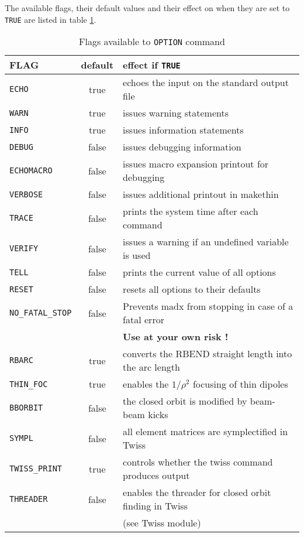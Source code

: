 The available flags, their default values and their effect on \madx when
they are set to \texttt{TRUE} are listed in table \ref{table:options}.

\begin{table}[ht]
  \caption{Flags available to \texttt{OPTION} command}
  \vspace{1ex}
  \centering
  \label{table:options}
  \begin{tabular}{|l|c|l|}
    \hline
    \textbf{FLAG }  & \textbf{default} & \textbf{effect if \texttt{TRUE}} \\
    \hline
    \texttt{ECHO}      & true  & echoes the input on the standard output file \\
    \texttt{WARN}      & true  & issues warning statements\\
    \texttt{INFO}      & true  & issues information statements\\
    \texttt{DEBUG}     & false & issues debugging information \\
    \texttt{ECHOMACRO} & false & issues macro expansion printout for debugging \\
    \texttt{VERBOSE}   & false & issues additional printout in makethin \\
    \texttt{TRACE}     & false & prints the system time after each command \\
    \texttt{VERIFY}    & false & issues a warning if an undefined variable is used 
    \\
    \hline
    \texttt{TELL}      & false & prints the current value of all options \\
    \texttt{RESET}     & false & resets all options to their defaults \\
    \hline
    \texttt{NO\_FATAL\_STOP} & false & Prevents madx from stopping in case of a fatal error \\
    &       & \textbf{Use at your own risk !} \\
    \hline
    \texttt{RBARC}     & true & converts the RBEND straight length into the arc length \\
    \texttt{THIN\_FOC} & true & enables the $1/\rho^2$ focusing of thin dipoles \\
    \texttt{BBORBIT}   & false & the closed orbit is modified by beam-beam kicks \\
    \texttt{SYMPL}     & false & all element matrices are symplectified in Twiss \\
    \texttt{TWISS\_PRINT} & true & controls whether the twiss command produces output \\
    \texttt{THREADER}  & false & enables the threader for closed orbit finding in Twiss \\ 
    &       & (see Twiss module) \\ 
    \hline
  \end{tabular}
\end{table}

